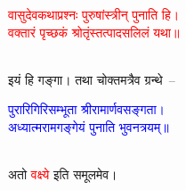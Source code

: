 \centering\textcolor{red}{वासुदेवकथाप्रश्नः पुरुषांस्त्रीन् पुनाति हि।\nopagebreak\\
वक्तारं पृच्छकं श्रोतृंस्तत्पादसलिलं यथा॥}\nopagebreak\\
\\
\fontsize{14}{21}\selectfont\begin{sloppypar}\justifying\noindent इयं हि गङ्गा। तथा चोक्तमत्रैव ग्रन्थे~–\end{sloppypar}
\centering\textcolor{blue}{पुरारिगिरिसम्भूता श्रीरामार्णवसङ्गता।\nopagebreak\\
अध्यात्मरामगङ्गेयं पुनाति भुवनत्रयम्॥}\nopagebreak\\
\\
\fontsize{14}{21}\selectfont\begin{sloppypar}\justifying\noindent अतो \textcolor{red}{वक्ष्ये} इति समूलमेव।\end{sloppypar}
